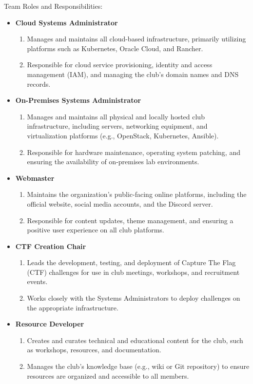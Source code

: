 \documentclass[12pt]{article}
\begin{document}
Team Roles and Responsibilities:
\begin{itemize}
  \item \textbf{Cloud Systems Administrator}
  \begin{enumerate}
    \item Manages and maintains all cloud-based infrastructure, primarily utilizing platforms such as Kubernetes, Oracle Cloud, and Rancher.
    \item Responsible for cloud service provisioning, identity and access management (IAM), and managing the club's domain names and DNS records.
  \end{enumerate}
  \item \textbf{On-Premises Systems Administrator}
  \begin{enumerate}
    \item Manages and maintains all physical and locally hosted club infrastructure, including servers, networking equipment, and virtualization platforms (e.g., OpenStack, Kubernetes, Ansible).
    \item Responsible for hardware maintenance, operating system patching, and ensuring the availability of on-premises lab environments.
  \end{enumerate}
  \item \textbf{Webmaster}
  \begin{enumerate}
    \item Maintains the organization's public-facing online platforms, including the official website, social media accounts, and the Discord server.
    \item Responsible for content updates, theme management, and ensuring a positive user experience on all club platforms.
  \end{enumerate}
  \item \textbf{CTF Creation Chair}
  \begin{enumerate}
    \item Leads the development, testing, and deployment of Capture The Flag (CTF) challenges for use in club meetings, workshops, and recruitment events.
    \item Works closely with the Systems Administrators to deploy challenges on the appropriate infrastructure.
  \end{enumerate}
  \item \textbf{Resource Developer}
  \begin{enumerate}
    \item Creates and curates technical and educational content for the club, such as workshops, resources, and documentation.
    \item Manages the club's knowledge base (e.g., wiki or Git repository) to ensure resources are organized and accessible to all members.
  \end{enumerate}
\end{itemize}
\end{document}
